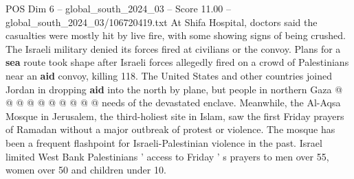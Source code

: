 \begin{textsample}{POS Dim 6 – global\_south\_2024\_03 – Score 11.00 – global\_south\_2024\_03/106720419.txt}
At Shifa Hospital, doctors said the casualties were mostly hit by live fire, with some showing signs of being crushed.
The Israeli military denied its forces fired at civilians or the convoy.
Plans for a \textbf{sea} route took shape after Israeli forces allegedly fired on a crowd of Palestinians near an \textbf{aid} convoy, killing 118.
The United States and other countries joined Jordan in dropping \textbf{aid} into the north by plane, but people in northern Gaza @ @ @ @ @ @ @ @ @ @ needs of the devastated enclave.
Meanwhile, the Al-Aqsa Mosque in Jerusalem, the third-holiest site in Islam, saw the first Friday prayers of Ramadan without a major outbreak of protest or violence.
The mosque has been a frequent flashpoint for Israeli-Palestinian violence in the past.
Israel limited West Bank Palestinians ' access to Friday ' s prayers to men over 55, women over 50 and children under 10.

\end{textsample}
